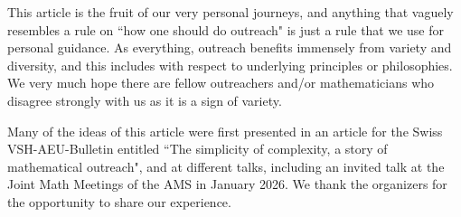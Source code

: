 \documentclass{notices}
\begin{document}
 This article is the fruit of our very personal journeys, and anything that vaguely resembles a rule on ``how one should do outreach" is just a rule that we use for personal guidance. As everything, outreach benefits immensely from variety and diversity, and this includes with respect to underlying principles or philosophies. We very much hope there are fellow outreachers and/or mathematicians who disagree strongly with us as it is a sign of variety.

\medskip


Many of the ideas of this article were first presented in an article for the Swiss VSH-AEU-Bulletin entitled ``The simplicity of complexity, a story of mathematical outreach", and at different talks, including an invited talk at the Joint Math Meetings of the AMS in January 2026. We thank the organizers for the opportunity to share our experience. 
\end{document}
